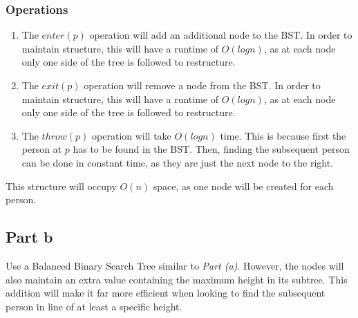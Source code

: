 \documentclass{article}
\begin{document}
\subsubsection{Operations}
\begin{enumerate}
    \item The $enter(p)$ operation will add an additional node to the BST.
        In order to maintain structure, this will have a runtime of $O(log n)$,
        as at each node only one side of the tree is followed to restructure.
    \item The $exit(p)$ operation will remove a node from the BST.
        In order to maintain structure, this will have a runtime of $O(log n)$,
        as at each node only one side of the tree is followed to restructure.
    \item The $throw(p)$ operation will take $O(log n)$ time.
        This is because first the person at $p$ has to be found in the BST.
        Then, finding the subsequent person can be done in constant time,
        as they are just the next node to the right.
\end{enumerate}

This structure will occupy $O(n)$ space, as one node will be created for each person.

\subsection{Part b}

Use a Balanced Binary Search Tree similar to \emph{Part (a)}.
However, the nodes will also maintain an extra value containing the maximum height in its subtree.
This addition will make it far more efficient when looking to find the subsequent person in line of at least a specific height.
\end{document}
